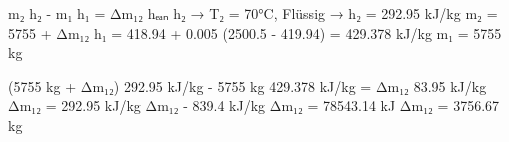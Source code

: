 m₂ h₂ - m₁ h₁ = Δm₁₂ hₑₐₙ  
h₂ → T₂ = 70°C, Flüssig → h₂ = 292.95 kJ/kg  
m₂ = 5755 + Δm₁₂  
h₁ = 418.94 + 0.005 (2500.5 - 419.94) = 429.378 kJ/kg  
m₁ = 5755 kg  

(5755 kg + Δm₁₂) 292.95 kJ/kg - 5755 kg 429.378 kJ/kg = Δm₁₂ 83.95 kJ/kg  
Δm₁₂ = 292.95 kJ/kg Δm₁₂ - 839.4 kJ/kg Δm₁₂ = 78543.14 kJ  
Δm₁₂ = 3756.67 kg